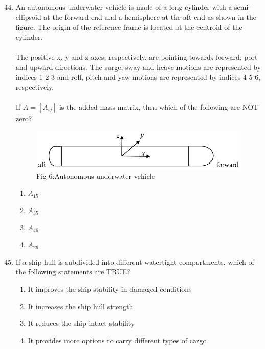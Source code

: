 \documentclass[journal]{IEEEtran}
\theoremstyle{remark}
\begin{document}
\begin{enumerate}[itemsep=1em]
\setcounter{enumi}{43}
\item An autonomous underwater vehicle is made of a long cylinder with a semi-ellipsoid at the forward end and a hemisphere at the aft end as shown in the figure. The origin of the reference frame is located at the centroid of the cylinder. \\
\\
The positive x, y and z axes, respectively, are pointing towards forward, port and upward directions. The surge, sway and heave motions are represented by indices 1-2-3 and roll, pitch and yaw motions are represented by indices 4-5-6, respectively. \\
\\
If $A=[A_{ij}]$ is the added mass matrix, then which of the following are NOT zero? 
\begin{figure}[H]
    \centering
    \includegraphics[width=0.4\columnwidth]{figs/fig-6.jpeg}
    \caption*{Fig-6:Autonomous underwater vehicle}
    \label{fig-6}
\end{figure}
\newpage
\vspace*{0.25cm}
\begin{multicols}{4}
\begin{enumerate}
    \item $A_{15}$
    \item $A_{35}$
    \item $A_{46}$
    \item $A_{26}$
\end{enumerate}
\end{multicols}
\end{enumerate}

\begin{enumerate}[itemsep=1em]
\setcounter{enumi}{44}
\item If a ship hull is subdivided into different watertight compartments, which of the following statements are TRUE? 
\begin{enumerate}[leftmargin=2.5em, labelsep=0.5em, itemsep=0.5em]
    \item It improves the ship stability in damaged conditions 
    \item It increases the ship hull strength 
    \item It reduces the ship intact stability 
    \item It provides more options to carry different types of cargo 
\end{enumerate}
\end{enumerate}
\end{document}
